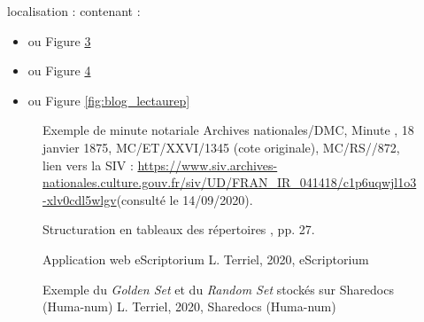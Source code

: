 localisation :  contenant :
\begin{itemize}
    \item {} ou Figure \ref{fig:appli_eScriptorium}
    \item {} ou Figure \ref{fig:shareDocs}
    \item {} ou Figure \ref{fig:blog_lectaurep}
\end{itemize}

\begin{figure}[h!]
    \centering
    \centerline{}
    \caption{Exemple de minute notariale \textcopyright Archives nationales/DMC, Minute , 18 janvier 1875,  MC/ET/XXVI/1345 (cote originale), MC/RS//872, lien vers la SIV : \url{https://www.siv.archives-nationales.culture.gouv.fr/siv/UD/FRAN_IR_041418/c1p6uqwjl1o3-xlv0cdl5wlgv}(consulté le 14/09/2020).}
    \label{fig:exemple_minute}
\end{figure}

\begin{figure}[h!]
    \centering
    \centerline{}
    \caption{Structuration en tableaux des répertoires \textcopyright \cite{bonhomme_defis_2018}, pp. 27.} 
    \label{fig:tableaux_repertoires}
\end{figure}

\begin{figure}[h]
    \centering
    \centerline{}
    \caption{Application web eScriptorium \textcopyright L. Terriel, 2020, eScriptorium} 
    \label{fig:appli_eScriptorium}
\end{figure}

\begin{figure}[h]
    \centering
    \centerline{}
    \caption{Exemple du \textit{Golden Set} et du \textit{Random Set} stockés sur Sharedocs (Huma-num) \textcopyright L. Terriel, 2020, Sharedocs (Huma-num)} 
    \label{fig:shareDocs}
\end{figure}

